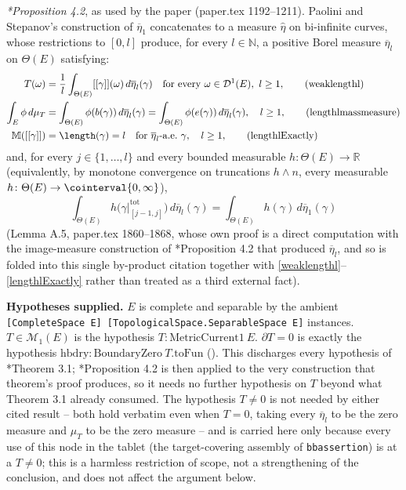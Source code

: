 \begin{definition}
  \emph{\cite{PS}*{Proposition 4.2}}, as used by the paper (paper.tex 1192--1211). Paolini and
  Stepanov's construction of $\overline{\eta}_1$ concatenates to a measure $\hat{\eta}$ on
  bi-infinite curves, whose restrictions to $[0,l]$ produce, for every $l \in \mathbb{N}$, a
  positive Borel measure $\overline{\eta}_l$ on $\Theta(E)$ satisfying:
  \begin{align}
    T(\omega) &= \frac{1}{l} \int_{\Theta(E)} [[\gamma]](\omega) \, d\overline{\eta}_l(\gamma)
    \quad \text{for every } \omega \in \mathcal{D}^1(E), \ l \ge 1,
    \tag{weaklengthl}
    \\
    \int_E \phi \, d\mu_T &= \int_{\Theta(E)} \phi(b(\gamma)) \, d\overline{\eta}_l(\gamma)
    = \int_{\Theta(E)} \phi(e(\gamma)) \, d\overline{\eta}_l(\gamma)
    ,\quad l \ge 1,
    \tag{lengthlmassmeasure}
    \\
    \mathbb{M}([[\gamma]]) &= \length(\gamma) = l \quad\text{for $\overline{\eta}_l$-a.e.}\ \gamma,
    \quad l \ge 1,
    \tag{lengthlExactly}
  \end{align}
  and, for every $j \in \{1,\dotsc,l\}$ and every bounded measurable
  $h \colon \Theta(E) \to \mathbb{R}$ (equivalently, by monotone convergence on truncations $h
  \wedge n$, every measurable $h \colon \Theta(E) \to \cointerval{0,\infty}$),
  \[
    \int_{\Theta(E)} h\bigl(\gamma\vert^{\mathrm{tot}}_{[j-1,j]}\bigr) \, d\overline{\eta}_l(\gamma)
    = \int_{\Theta(E)} h(\gamma) \, d\overline{\eta}_1(\gamma)
    \tag{marginal}
  \]
  (Lemma A.5, paper.tex 1860--1868, whose own proof is a direct computation with the image-measure
  construction of \cite{PS}*{Proposition 4.2} that produced $\overline{\eta}_l$, and so is folded
  into this single by-product citation together with \eqref{weaklengthl}--\eqref{lengthlExactly}
  rather than treated as a third external fact).

  \textbf{Hypotheses supplied.} $E$ is complete and separable by the ambient
  \texttt{[CompleteSpace E] [TopologicalSpace.SeparableSpace E]} instances. $T \in \mathcal{M}_1(E)$
  is the hypothesis $T : \mathrm{MetricCurrent1}\ E$. $\partial T = 0$ is exactly the hypothesis
  $\mathrm{hbdry} : \mathrm{BoundaryZero}\ T.\mathrm{toFun}$ (). This
  discharges every hypothesis of \cite{PS}*{Theorem 3.1}; \cite{PS}*{Proposition 4.2} is then
  applied to the very construction that theorem's proof produces, so it needs no further
  hypothesis on $T$ beyond what Theorem 3.1 already consumed. The hypothesis $T \neq 0$ is not
  needed by either cited result -- both hold verbatim even when $T = 0$, taking every
  $\overline{\eta}_l$ to be the zero measure and $\mu_T$ to be the zero measure -- and is carried
  here only because every use of this node in the tablet (the target-covering assembly of
  \texttt{bbassertion}) is at a $T \neq 0$; this is a harmless restriction of scope, not a
  strengthening of the conclusion, and does not affect the argument below.


\end{definition}
